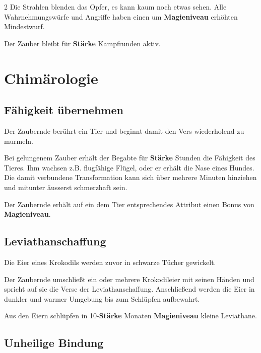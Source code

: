 \begin{multicols*}{2}
Die Strahlen blenden das Opfer, es kann kaum noch etwas sehen. Alle Wahrnehmungswürfe und Angriffe haben einen um \textbf{Magieniveau} erhöhten Mindestwurf.

Der Zauber bleibt für \textbf{Stärke} Kampfrunden aktiv.



\section{Chimärologie}

\subsection{Fähigkeit übernehmen}

Der Zaubernde berührt ein Tier und beginnt damit den Vers wiederholend zu murmeln.

Bei gelungenem Zauber erhält der Begabte für \textbf{Stärke} Stunden die Fähigkeit des Tieres. Ihm wachsen z.B. flugfähige Flügel, oder er erhält die Nase eines Hundes. Die damit verbundene Transformation kann sich über mehrere Minuten hinziehen und mitunter äusserst schmerzhaft sein.

Der Zaubernde erhält auf ein dem Tier entsprechendes Attribut einen Bonus von \textbf{Magieniveau}.



\subsection{Leviathanschaffung}

Die Eier eines Krokodils werden zuvor in schwarze Tücher gewickelt.

Der Zaubernde umschließt ein oder mehrere Krokodileier mit seinen Händen und spricht auf sie die Verse der Leviathanschaffung. Anschließend werden die Eier in dunkler und warmer Umgebung bis zum Schlüpfen aufbewahrt.

Aus den Eiern schlüpfen in 10-\textbf{Stärke} Monaten \textbf{Magieniveau} kleine Leviathane.



\subsection{Unheilige Bindung}


\end{multicols*}
